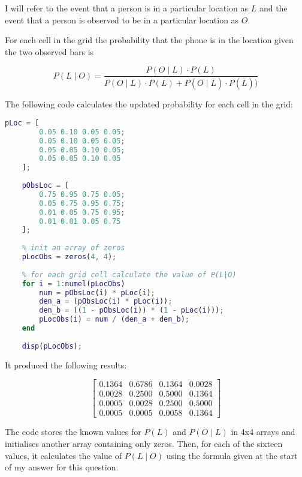 \documentclass[12pt]{article}
\begin{document}
\noindent I will refer to the event that a person is in a particular location as $L$ and the event that a person is observed to be in a particular location as $O$.

\indent For each cell in the grid the probability that the phone is in the location given the two observed bars is

$$ P(L \mid O) = \frac{P(O \mid L) \cdot P(L)}{P(O \mid L) \cdot P(L) + P(O \mid \overline{L}) \cdot P(\overline{L}))} $$

\indent The following code calculates the updated probability for each cell in the grid:

\begin{lstlisting}[language=Matlab]
    pLoc = [
        0.05 0.10 0.05 0.05;
        0.05 0.10 0.05 0.05;
        0.05 0.05 0.10 0.05;
        0.05 0.05 0.10 0.05
    ];
    
    pObsLoc = [
        0.75 0.95 0.75 0.05;
        0.05 0.75 0.95 0.75;
        0.01 0.05 0.75 0.95;
        0.01 0.01 0.05 0.75
    ];
    
    % init an array of zeros
    pLocObs = zeros(4, 4);
    
    % for each grid cell calculate the value of P(L|O)
    for i = 1:numel(pLocObs)
        num = pObsLoc(i) * pLoc(i);
        den_a = (pObsLoc(i) * pLoc(i));
        den_b = ((1 - pObsLoc(i)) * (1 - pLoc(i)));
        pLocObs(i) = num / (den_a + den_b);
    end
    
    disp(pLocObs);
\end{lstlisting}

\indent It produced the following results:

$$
\begin{bmatrix}
    0.1364 &0.6786 &0.1364 &0.0028 \\
    0.0028 &0.2500 &0.5000 &0.1364 \\
    0.0005 &0.0028 &0.2500 &0.5000 \\
    0.0005 &0.0005 &0.0058 &0.1364
\end{bmatrix}
$$

\indent The code stores the known values for $P(L)$ and $P(O \mid L)$ in 4x4 arrays and initialises another array containing only zeros. Then, for each of the sixteen values, it calculates the value of $P(L \mid O)$ using the formula given at the start of my answer for this question.
\end{document}
